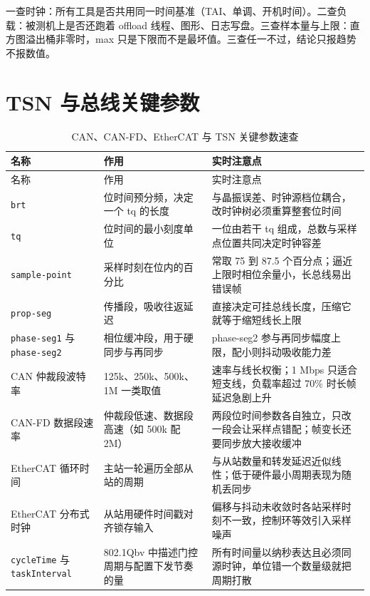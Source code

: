 \documentclass[12pt,a4paper,fontset=fandol]{ctexbook}
\newcommand{\Tp}[1]{\texttt{#1}}
\begin{document}
\begin{note}[title={测量三查}]
一查时钟：所有工具是否共用同一时间基准（TAI、单调、开机时间）。二查负载：被测机上是否还跑着 offload 线程、图形、日志写盘。三查样本量与上限：直方图溢出桶非零时，max 只是下限而不是最坏值。三查任一不过，结论只报趋势不报数值。
\end{note}

\section{TSN 与总线关键参数}

\begin{longtable}{>{\raggedright\arraybackslash\footnotesize}p{} >{\raggedright\arraybackslash\footnotesize}p{} >{\raggedright\arraybackslash\footnotesize}p{}}
\caption{CAN、CAN-FD、EtherCAT 与 TSN 关键参数速查}\label{tab:apB-bus} \\
\toprule 名称 & 作用 & 实时注意点 \\ \midrule
\endfirsthead
\toprule 名称 & 作用 & 实时注意点 \\ \midrule
\endhead
\bottomrule \endfoot
\endlastfoot
\Tp{brt} & 位时间预分频，决定一个 tq 的长度 & 与晶振误差、时钟源档位耦合，改时钟树必须重算整套位时间 \\
\Tp{tq} & 位时间的最小刻度单位 & 一位由若干 tq 组成，总数与采样点位置共同决定时钟容差 \\
\Tp{sample-point} & 采样时刻在位内的百分比 & 常取 75 到 87.5 个百分点；逼近上限时相位余量小，长总线易出错误帧 \\
\Tp{prop-seg} & 传播段，吸收往返延迟 & 直接决定可挂总线长度，压缩它就等于缩短线长上限 \\
\Tp{phase-seg1} 与 \Tp{phase-seg2} & 相位缓冲段，用于硬同步与再同步 & phase-seg2 参与再同步幅度上限，配小则抖动吸收能力差 \\
CAN 仲裁段波特率 & 125k、250k、500k、1M 一类取值 & 速率与线长权衡；1 Mbps 只适合短支线，负载率超过 70\% 时长帧延迟急剧上升 \\
CAN-FD 数据段速率 & 仲裁段低速、数据段高速（如 500k 配 2M） & 两段位时间参数各自独立，只改一段会让采样点错配；帧变长还要同步放大接收缓冲 \\
EtherCAT 循环时间 & 主站一轮遍历全部从站的周期 & 与从站数量和转发延迟近似线性；低于硬件最小周期表现为随机丢同步 \\
EtherCAT 分布式时钟 & 从站用硬件时间戳对齐锁存输入 & 偏移与抖动未收敛时各站采样时刻不一致，控制环等效引入采样噪声 \\
\Tp{cycleTime} 与 \Tp{taskInterval} & 802.1Qbv 中描述门控周期与配置下发节奏的量 & 所有时间量以纳秒表达且必须同源时钟，单位错一个数量级就把周期打散 \\

\end{longtable}
\end{document}
